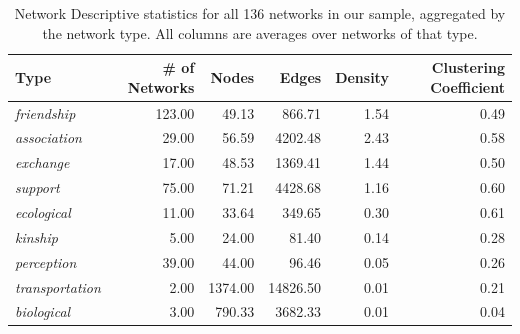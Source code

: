 \documentclass[3p,times]{elsarticle}
\begin{document}
\begin{table}[ht]
\centering
\caption{\label{tab:descriptive stats by type} Network Descriptive statistics for all 136 networks in our sample, aggregated by the network type. All columns are averages over networks of that type.}
\begin{tabular}{lrrrrr}
  \toprule
 \textbf{Type} & \textbf{\# of Networks} & \textbf{Nodes} & \textbf{Edges} & \textbf{Density} & \textbf{Clustering Coefficient} \\ 
  \midrule
\emph{friendship} & 123.00 & 49.13 & 866.71 & 1.54 & 0.49 \\ 
  \emph{association} & 29.00 & 56.59 & 4202.48 & 2.43 & 0.58 \\ 
  \emph{exchange} & 17.00 & 48.53 & 1369.41 & 1.44 & 0.50 \\ 
  \emph{support} & 75.00 & 71.21 & 4428.68 & 1.16 & 0.60 \\ 
  \emph{ecological} & 11.00 & 33.64 & 349.65 & 0.30 & 0.61 \\ 
  \emph{kinship} & 5.00 & 24.00 & 81.40 & 0.14 & 0.28 \\ 
  \emph{perception} & 39.00 & 44.00 & 96.46 & 0.05 & 0.26 \\ 
  \emph{transportation} & 2.00 & 1374.00 & 14826.50 & 0.01 & 0.21 \\ 
  \emph{biological} & 3.00 & 790.33 & 3682.33 & 0.01 & 0.04 \\ 
   \bottomrule
\end{tabular}
\end{table}



	
\end{document}
